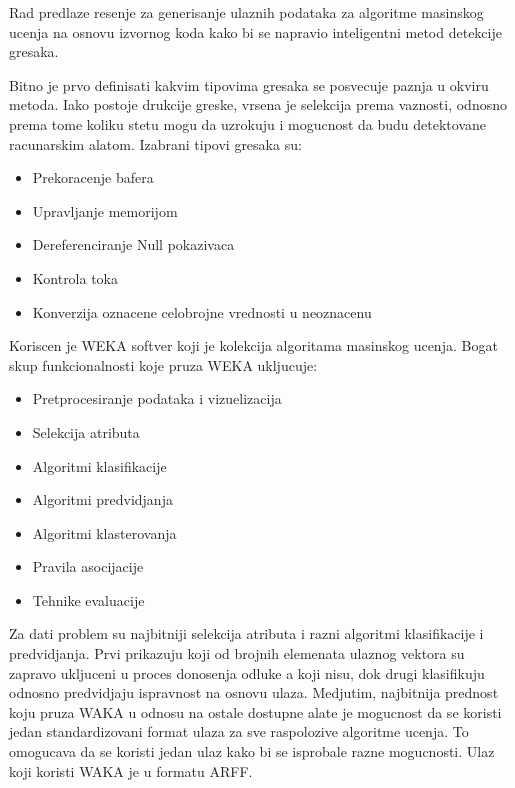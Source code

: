 \documentclass[a4paper]{article}
\begin{document}
{%



Rad \cite{staticFeatures} predlaze resenje za generisanje ulaznih podataka za algoritme masinskog ucenja na osnovu
izvornog koda kako bi se napravio inteligentni metod detekcije gresaka.

Bitno je prvo definisati kakvim tipovima gresaka se posvecuje paznja u okviru metoda.
Iako postoje drukcije greske, vrsena je selekcija prema vaznosti, odnosno prema tome
koliku stetu mogu da uzrokuju i mogucnost da budu detektovane racunarskim alatom. Izabrani tipovi gresaka su:
\begin{itemize}
\item Prekoracenje bafera

\item Upravljanje memorijom

\item Dereferenciranje Null pokazivaca

\item Kontrola toka

\item Konverzija oznacene celobrojne vrednosti u neoznacenu
\end{itemize}


Koriscen je WEKA softver koji je kolekcija algoritama masinskog ucenja.
Bogat skup funkcionalnosti koje pruza WEKA ukljucuje:
\begin{itemize}
\item Pretprocesiranje podataka i vizuelizacija
\item Selekcija atributa
\item Algoritmi klasifikacije
\item Algoritmi predvidjanja
\item Algoritmi klasterovanja
\item Pravila asocijacije
\item Tehnike evaluacije
\end{itemize}


Za dati problem su najbitniji selekcija atributa i razni algoritmi klasifikacije i predvidjanja.
Prvi prikazuju koji od brojnih elemenata ulaznog vektora su zapravo ukljuceni u proces donosenja odluke a koji nisu, dok
drugi klasifikuju odnosno predvidjaju ispravnost na osnovu ulaza.
Medjutim, najbitnija prednost koju pruza WAKA u odnosu na ostale dostupne alate je mogucnost da se koristi
jedan standardizovani format ulaza za sve raspolozive algoritme ucenja. To omogucava da se koristi jedan ulaz kako bi se isprobale
razne mogucnosti. Ulaz koji koristi WAKA je u formatu ARFF.

}
\end{document}
